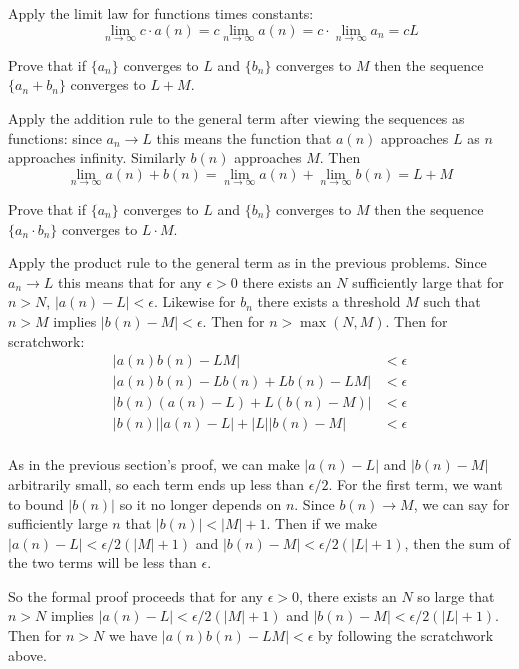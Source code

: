 \documentclass{article}
\begin{document}
Apply the limit law for functions times constants:
$$\lim_{n\to\infty} c \cdot a(n) = c \lim_{n\to\infty} a(n) = c \cdot \lim_{n\to\infty}a_n = cL$$

\begin{problem}
Prove that if $\{a_n\}$ converges to $L$ and $\{b_n\}$ converges to $M$ then the sequence $\{a_n + b_n\}$ converges to $L + M$.
\end{problem}

Apply the addition rule to the general term after viewing the sequences as functions: since $a_n \to L$ this means the function that $a(n)$ approaches $L$ as $n$ approaches infinity. Similarly $b(n)$ approaches $M$. Then
$$\lim_{n\to\infty} a(n) + b(n) = \lim_{n\to\infty} a(n) + \lim_{n\to\infty} b(n) = L + M$$

\begin{problem}
Prove that if $\{a_n\}$ converges to $L$ and $\{b_n\}$ converges to $M$ then the sequence $\{a_n \cdot b_n\}$ converges to $L \cdot M$.
\end{problem}

Apply the product rule to the general term as in the previous problems. Since $a_n \to L$ this means that for any $\epsilon > 0$ there exists an $N$ sufficiently large that for $n > N$, $|a(n) - L| < \epsilon$. Likewise for $b_n$ there exists a threshold $M$ such that $n > M$ implies $|b(n) - M| < \epsilon$. Then for $n > \max(N, M)$. Then for scratchwork:
\begin{align*}
  |a(n)b(n) - LM|                  & < \epsilon \\
  |a(n)b(n) - Lb(n) + Lb(n) - LM|  & < \epsilon \\
  |b(n)(a(n) - L) + L(b(n) - M)|   & < \epsilon \\
  |b(n)||a(n) - L| + |L||b(n) - M| & < \epsilon \\
\end{align*}

As in the previous section's proof, we can make $|a(n) - L|$ and $|b(n) - M|$ arbitrarily small, so each term ends up less than $\epsilon / 2$. For the first term, we want to bound $|b(n)|$ so it no longer depends on $n$. Since $b(n) \to M$, we can say for sufficiently large $n$ that $|b(n)| < |M| + 1$. Then if we make $|a(n) - L| < \epsilon / 2(|M| + 1)$ and $|b(n) - M| < \epsilon / 2(|L| + 1)$, then the sum of the two terms will be less than $\epsilon$.

So the formal proof proceeds that for any $\epsilon > 0$, there exists an $N$ so large that $n > N$ implies $|a(n) - L| < \epsilon / 2(|M| + 1)$ and $|b(n) - M| < \epsilon / 2(|L| + 1)$. Then for $n > N$ we have $|a(n)b(n) - LM| < \epsilon$ by following the scratchwork above.
\end{document}
